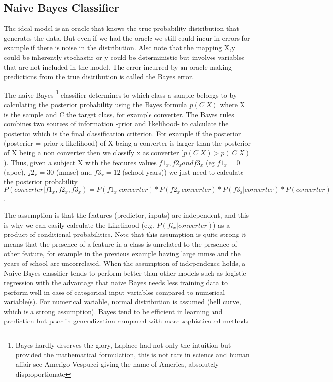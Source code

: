 \documentclass[12pt]{report}
\begin{document}
\subsection{Naive Bayes Classifier}
The ideal model is an oracle that knows the true probability distribution that generates the data. But even if we had the oracle we still could incur in errors for example if there is noise in the distribution.
Also note that the mapping X,y could be inherently stochastic  or y could be deterministic but involves variables that are not included in the model. The error incurred by an oracle making predictions from the true distribution is called the Bayes error.

The naive Bayes \footnote{Bayes hardly deserves the glory, Laplace had not only the intuition but provided the mathematical formulation, this is not rare in science and human affair see Amerigo Vespucci giving the name of America, absolutely disproportionate} classifier determines to which class a sample belongs to by calculating the posterior probability using the Bayes formula $p(C|X)$ where X is the sample and C the target class, for example converter.
The Bayes rules combines two sources of information -prior and likelihood- to calculate the posterior which is the final classification criterion.
For example if the posterior (posterior = prior x likelihood) of X being a converter is larger than the posterior of X being a non converter then we classify x as converter ($p(C|X) > p(~C|X)$). Thus, given a subject X with the features values $f1_x, f2_x and f3_x$ (eg $f1_x=0$ (apoe), $f2_x=30$ (mmse) and $f3_x=12$ (school years)) we just need to calculate 
the posterior probability $P(converter|f1_x, f2_x, f3_x) = P(f1_x|converter) * P(f2_x|converter) * P(f3_x|converter) * P(converter)$.

The assumption is that the features (predictor, inputs) are independent, and this is why we can easily calculate the Likelihood (e.g. $P(fi_x|converter)$) as a product of conditional probabilities. Note that this assumption is quite strong it means that the presence of a feature in a class is unrelated to the presence of other feature, for example in the previous example having large mmse and the years of school are uncorrelated.
When the assumption of independence holds, a Naive Bayes classifier tends to perform better than other models such as logistic regression with the advantage that naive Bayes needs less training data to perform well in case of categorical input variables compared to numerical variable(s). For numerical variable, normal distribution is assumed (bell curve, which is a strong assumption).
Bayes tend to be efficient in learning and prediction but poor in generalization compared with more sophisticated methods.
\end{document}
